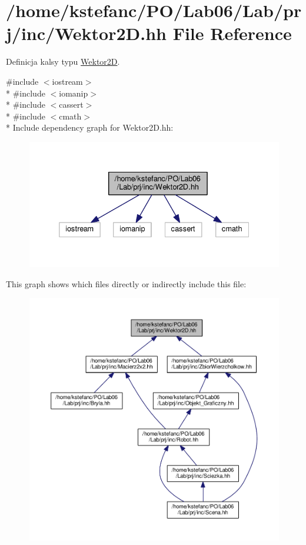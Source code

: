 \hypertarget{_wektor2_d_8hh}{\section{/home/kstefanc/\+P\+O/\+Lab06/\+Lab/prj/inc/\+Wektor2\+D.hh File Reference}
\label{_wektor2_d_8hh}
}


Definicja kalsy typu \hyperlink{class_wektor2_d}{Wektor2\+D}.  


{\ttfamily \#include $<$iostream$>$}\\*
{\ttfamily \#include $<$iomanip$>$}\\*
{\ttfamily \#include $<$cassert$>$}\\*
{\ttfamily \#include $<$cmath$>$}\\*
Include dependency graph for Wektor2\+D.\+hh\+:\nopagebreak
\begin{figure}[H]
\begin{center}
\leavevmode
\includegraphics[width=332pt]{_wektor2_d_8hh__incl}
\end{center}
\end{figure}
This graph shows which files directly or indirectly include this file\+:\nopagebreak
\begin{figure}[H]
\begin{center}
\leavevmode
\includegraphics[width=350pt]{_wektor2_d_8hh__dep__incl}
\end{center}
\end{figure}
